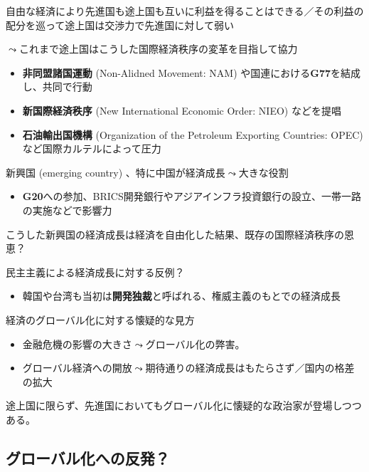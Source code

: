 \documentclass[
  xelatex,
  ja=standard]{bxjsarticle}
\providecommand{\tightlist}{%
  \setlength{\itemsep}{0pt}\setlength{\parskip}{0pt}}\usepackage{longtable,booktabs,array}
\begin{document}
自由な経済により先進国も途上国も互いに利益を得ることはできる／その利益の配分を巡って途上国は交渉力で先進国に対して弱い

\(\leadsto\)これまで途上国はこうした国際経済秩序の変革を目指して協力

\begin{itemize}
\tightlist
\item
  \textbf{非同盟諸国運動} (Non-Alidned Movement: NAM)
  や国連における\textbf{G77}を結成し、共同で行動
\item
  \textbf{新国際経済秩序} (New International Economic Order: NIEO)
  などを提唱
\item
  \textbf{石油輸出国機構} (Organization of the Petroleum Exporting
  Countries: OPEC) など国際カルテルによって圧力
\end{itemize}

新興国 (emerging country) 、特に中国が経済成長\(\leadsto\)大きな役割

\begin{itemize}
\tightlist
\item
  \textbf{G20}への参加、BRICS開発銀行やアジアインフラ投資銀行の設立、一帯一路の実施などで影響力
\end{itemize}

こうした新興国の経済成長は経済を自由化した結果、既存の国際経済秩序の恩恵？

民主主義による経済成長に対する反例？

\begin{itemize}
\tightlist
\item
  韓国や台湾も当初は\textbf{開発独裁}と呼ばれる、権威主義のもとでの経済成長
\end{itemize}

経済のグローバル化に対する懐疑的な見方

\begin{itemize}
\tightlist
\item
  金融危機の影響の大きさ\(\leadsto\)グローバル化の弊害。
\item
  グローバル経済への開放\(\leadsto\)期待通りの経済成長はもたらさず／国内の格差の拡大
\end{itemize}

途上国に限らず、先進国においてもグローバル化に懐疑的な政治家が登場しつつある。

\hypertarget{ux30b0ux30edux30fcux30d0ux30ebux5316ux3078ux306eux53cdux767a}{%
\subsection{グローバル化への反発？}\label{ux30b0ux30edux30fcux30d0ux30ebux5316ux3078ux306eux53cdux767a}}
\end{document}
